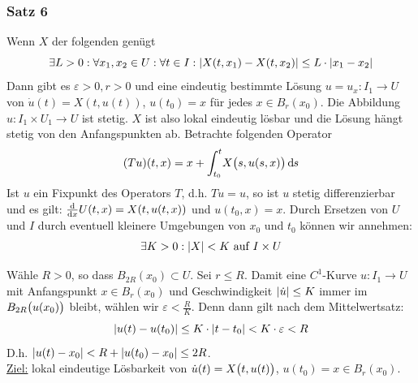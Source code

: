 \subsubsection[Satz 6: (Picard-Lindelöf)]{Satz 6} %
\label{ssub:231}
Wenn $X$ der folgenden  genügt 
\[
	\exists L >0 : \forall x_1, x_2 \in U : \forall t \in I : \abs*{X(t,x_1) - X(t,x_2)} \le L \cdot \abs*{x_1 - x_2}  
\]
Dann gibt es $\varepsilon>0, r>0$ und eine eindeutig bestimmte Lösung $u=u_x : I_1 \to U$ von $\dot u (t) = X(t, u(t))$, $u(t_0) =x$ für jedes $x \in B_r(x_0)$. Die 
Abbildung $u : I_1 \times U_1 \to U$ ist stetig.
$X$ ist also lokal eindeutig lösbar und die Lösung hängt stetig von den Anfangspunkten ab.
Betrachte folgenden Operator
\[
	(T u) (t,x) = x + \int_{t_0} ^{t} \! X\enbrace[\big]{s, u (s,x)}  \, \mathd s
\]
Ist $u$ ein Fixpunkt des Operators $T$, d.h. $T u = u$, so ist $u$ stetig differenzierbar und es gilt: $\diffd{}{x} U(t,x) = X (t, u(t,x))$ und $u(t_0,x) =x$. Durch
Ersetzen von $U$ und $I$ durch eventuell kleinere Umgebungen von $x_0$ und $t_0$ können wir annehmen: 
\[
	\exists K>0 : \abs*{X} < K \text{ auf } I \times U 
\]
\begin{figure}[ht]
\end{figure}
Wähle $R>0$, so dass $B_{2R}(x_0) \subset U$. Sei $r \le R$. Damit eine $C^1$-Kurve $u : I_1 \to U$ mit Anfangspunkt $x \in B_r(x_0)$ und Geschwindigkeit 
$\abs*{\dot u} \le K $ immer im $B_{2R}\enbrace[\big]{u(x_0)}$ bleibt, wählen wir $\varepsilon < \frac{R}{K}$. Denn dann gilt nach dem Mittelwertsatz: 
\[
	\abs*{u(t) - u(t_0)} \le K \cdot \abs*{t- t_0} < K \cdot \varepsilon < R  
\]
D.h. $\abs*{u(t) - x_0} < R + \abs*{u(t_0)- x_0} \le 2 R$.\\
\uline{Ziel:} lokal eindeutige Lösbarkeit von $\dot u(t) = X\enbrace[\big]{t,u(t)}$, $u(t_0) =x \in B_r(x_0)$.

